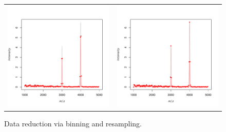 \documentclass[a4paper]{article}
\begin{document}
\begin{figure}
\begin{center}
\begin{tabular}{cc}
\includegraphics{Cardinal-demo-059}
&
\includegraphics{Cardinal-demo-060}
\end{tabular}
\caption{\small Data reduction via binning and resampling.}
\end{center}
\end{figure}
\end{document}
